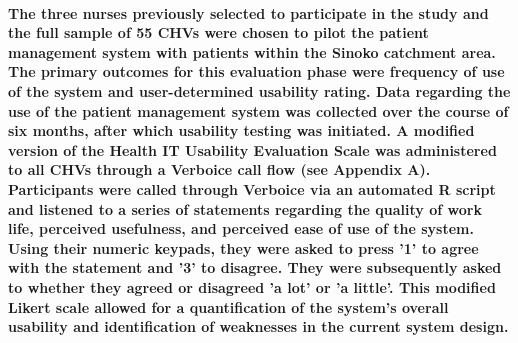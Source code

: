 \paragraph{The three nurses previously selected to participate in the study and the full sample of 55 CHVs were chosen to pilot the patient management system with patients within the Sinoko catchment area. The primary outcomes for this evaluation phase were frequency of use of the system and user-determined usability rating. Data regarding the use of the patient management system was collected over the course of six months, after which usability testing was initiated. A modified version of the Health IT Usability Evaluation Scale \citep{Yen2010} was administered to all CHVs through a Verboice call flow (see Appendix A). Participants were called through Verboice via an automated R script and listened to a series of statements regarding the quality of work life, perceived usefulness, and perceived ease of use of the system. Using their numeric keypads, they were asked to press '1' to agree with the statement and '3' to disagree. They were subsequently asked to whether they agreed or disagreed 'a lot' or 'a little'. This modified Likert scale allowed for a quantification of the system's overall usability and identification of weaknesses in the current system design.}


